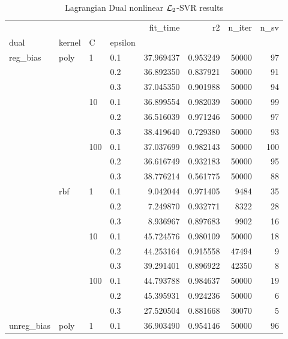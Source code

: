 \begin{table}[H]
\centering
\caption{Lagrangian Dual nonlinear $\protect \mathcal{L}_2$-SVR results}
\label{nonlinear_lagrangian_dual_l2_svr_cv_results}
\begin{tabular}{llllrrrr}
\toprule
           &     &     &     &   fit\_time &        r2 &  n\_iter &  n\_sv \\
dual & kernel & C & epsilon &            &           &         &       \\
\midrule
reg\_bias & poly & 1   & 0.1 &  37.969437 &  0.953249 &   50000 &    97 \\
           &     &     & 0.2 &  36.892350 &  0.837921 &   50000 &    91 \\
           &     &     & 0.3 &  37.045350 &  0.901988 &   50000 &    94 \\
           &     & 10  & 0.1 &  36.899554 &  0.982039 &   50000 &    99 \\
           &     &     & 0.2 &  36.516039 &  0.971246 &   50000 &    97 \\
           &     &     & 0.3 &  38.419640 &  0.729380 &   50000 &    93 \\
           &     & 100 & 0.1 &  37.037699 &  0.982143 &   50000 &   100 \\
           &     &     & 0.2 &  36.616749 &  0.932183 &   50000 &    95 \\
           &     &     & 0.3 &  38.776214 &  0.561775 &   50000 &    88 \\
           & rbf & 1   & 0.1 &   9.042044 &  0.971405 &    9484 &    35 \\
           &     &     & 0.2 &   7.249870 &  0.932771 &    8322 &    28 \\
           &     &     & 0.3 &   8.936967 &  0.897683 &    9902 &    16 \\
           &     & 10  & 0.1 &  45.724576 &  0.980109 &   50000 &    18 \\
           &     &     & 0.2 &  44.253164 &  0.915558 &   47494 &     9 \\
           &     &     & 0.3 &  39.291401 &  0.896922 &   42350 &     8 \\
           &     & 100 & 0.1 &  44.793788 &  0.984637 &   50000 &    19 \\
           &     &     & 0.2 &  45.395931 &  0.924236 &   50000 &     6 \\
           &     &     & 0.3 &  27.520504 &  0.881668 &   30070 &     5 \\
unreg\_bias & poly & 1   & 0.1 &  36.903490 &  0.954146 &   50000 &    96 \\

\end{tabular}
\end{table}
